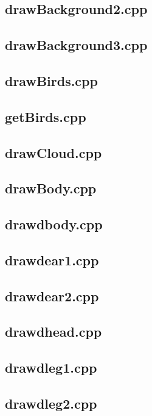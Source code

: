 \documentclass{article}
\begin{document}
\newpage\subsection{drawBackground2.cpp}
\newpage\subsection{drawBackground3.cpp}
\newpage\subsection{drawBirds.cpp}
\newpage\subsection{getBirds.cpp}
\newpage\subsection{drawCloud.cpp}
\newpage\subsection{drawBody.cpp}
\newpage\subsection{drawdbody.cpp}
\newpage\subsection{drawdear1.cpp}
\newpage\subsection{drawdear2.cpp}
\newpage\subsection{drawdhead.cpp}
\newpage\subsection{drawdleg1.cpp}
\newpage\subsection{drawdleg2.cpp}
\end{document}

